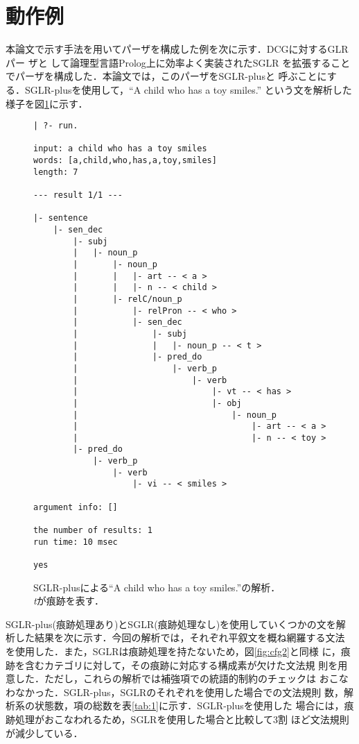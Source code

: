 \section{動作例}

本論文で示す手法を用いてパーザを構成した例を次に示す．DCGに対するGLRパー
ザと\break
して論理型言語Prolog上に効率よく実装されたSGLR\cite{Numazaki1991}
を拡張することでパーザを構成した．本論文では，このパーザをSGLR-plusと
呼ぶことにする．SGLR-plusを使用して，``A child who has a toy smiles.''
という文を解析した様子を図\ref{fig:sglr_plus}に示す．

\begin{figure}[htbp]
  \begin{center}
    \begin{minipage}{11cm}
      {\baselineskip=8pt
\begin{verbatim}
| ?- run.

input: a child who has a toy smiles
words: [a,child,who,has,a,toy,smiles]
length: 7

--- result 1/1 ---

|- sentence
    |- sen_dec
        |- subj
        |   |- noun_p
        |       |- noun_p
        |       |   |- art -- < a >
        |       |   |- n -- < child >
        |       |- relC/noun_p
        |           |- relPron -- < who >
        |           |- sen_dec
        |               |- subj
        |               |   |- noun_p -- < t >
        |               |- pred_do
        |                   |- verb_p
        |                       |- verb
        |                           |- vt -- < has >
        |                           |- obj
        |                               |- noun_p
        |                                   |- art -- < a >
        |                                   |- n -- < toy >
        |- pred_do
            |- verb_p
                |- verb
                    |- vi -- < smiles >

argument info: []

the number of results: 1 
run time: 10 msec

yes
\end{verbatim}
        }
    \end{minipage}
    \caption{SGLR-plusによる``A child who has a toy smiles.''の解析．
      \\{\it t}が痕跡を表す．}
    \label{fig:sglr_plus}
  \end{center}
\end{figure}

SGLR-plus(痕跡処理あり)とSGLR(痕跡処理なし)を使用していくつかの文を解
析した結果を次に示す．今回の解析では，それぞれ平叙文を概ね網羅する文法
を使用した．また，SGLRは痕跡処理を持たないため，図\ref{fig:cfg2}と同様
に，痕跡を含むカテゴリに対して，その痕跡に対応する構成素が欠けた文法規
則を用意した．ただし，これらの解析では補強項での統語的制約のチェックは
おこなわなかった．SGLR-plus，SGLRのそれぞれを使用した場合での文法規則
数，解析系の状態数，項の総数を表\ref{tab:1}に示す．SGLR-plusを使用した
場合には，痕跡処理がおこなわれるため，SGLRを使用した場合と比較して3割
ほど文法規則が減少している．


